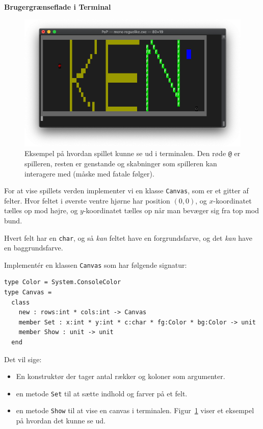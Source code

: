\textbf{Brugergrænseflade i Terminal}
\begin{figure}[thp]\centering

  \includegraphics[width=.99\linewidth]{screenshot.png}

  \caption{Eksempel på hvordan spillet kunne se ud i terminalen. Den
    røde \texttt{@} er spilleren, resten er genstande og skabninger
    som spilleren kan interagere med (måske med fatale følger).}
  \label{fig:roguelike-screenshot}
\end{figure}

For at vise spillets verden implementer vi en klasse
\lstinline{Canvas}, som er et gitter af felter. Hvor feltet
i øverste ventre hjørne har position $(0,0)$, og $x$-koordinatet
tælles op mod højre, og $y$-koordinatet tælles op når man bevæger sig
fra top mod bund.

Hvert felt har en \lstinline{char}, og så \emph{kan}
feltet have en forgrundsfarve, og det \emph{kan} have en baggrundsfarve.

Implementér en klassen \lstinline{Canvas} som har følgende signatur:

\begin{lstlisting}
type Color = System.ConsoleColor
type Canvas =
  class
    new : rows:int * cols:int -> Canvas
    member Set : x:int * y:int * c:char * fg:Color * bg:Color -> unit
    member Show : unit -> unit
  end
\end{lstlisting}

Det vil sige:
\begin{itemize}
\item En konstruktør der tager antal rækker og koloner som argumenter.
\item en metode \lstinline{Set} til at sætte indhold og farver på et
  felt.
\item en metode \lstinline{Show} til at vise en canvas i
  terminalen. Figur~\ref{fig:roguelike-screenshot} viser et eksempel
  på hvordan det kunne se ud.
\end{itemize}

